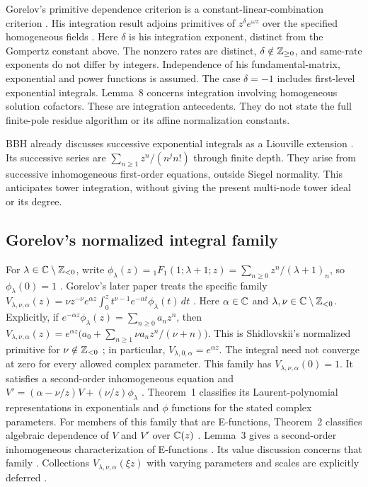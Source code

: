 Gorelov's primitive dependence criterion is a constant-linear-combination criterion
\cite[Lemma~6, p.~670]{Gorelov2016}.
His integration result adjoins primitives of $z^\delta e^{\omega z}$
over the specified homogeneous fields
\cite[Lemma~7, pp.~670--672]{Gorelov2016}.
Here $\delta$ is his integration exponent, distinct from the Gompertz constant above.
The nonzero rates are distinct, $\delta\notin\mathbb{Z}_{\ge0}$,
and same-rate exponents do not differ by integers.
Independence of his fundamental-matrix, exponential and power functions is assumed.
The case $\delta=-1$ includes first-level exponential integrals.
Lemma~8 concerns integration involving homogeneous solution cofactors.
These are integration antecedents.
They do not state the full finite-pole residue algorithm or its affine normalization constants.

BBH already discusses successive exponential integrals as a Liouville extension
\cite[p.~281]{BBH1988}.
Its successive series are $\sum_{n\ge1}z^n/(n^j n!)$ through finite depth.
They arise from successive inhomogeneous first-order equations, outside Siegel normality.
This anticipates tower integration, without giving the present multi-node tower ideal or its degree.

\subsection*{Gorelov's normalized integral family}
For $\lambda\in\mathbb{C}\setminus\mathbb{Z}_{<0}$, write
$\phi_\lambda(z)={}_1F_1(1;\lambda+1;z)=\sum_{n\ge0}z^n/(\lambda+1)_n$,
so $\phi_\lambda(0)=1$ \cite[p.~384]{Gorelov2025}.
Gorelov's later paper treats the specific family
$V_{\lambda,\nu,\alpha}(z)=\allowbreak\nu z^{-\nu}e^{\alpha z}\allowbreak\int_0^z t^{\nu-1}e^{-\alpha t}\phi_\lambda(t)\,dt$
\cite[pp.~383--384]{Gorelov2025}.
Here $\alpha\in\mathbb{C}$ and $\lambda,\nu\in\mathbb{C}\setminus\mathbb{Z}_{<0}$.
Explicitly, if $e^{-\alpha z}\phi_\lambda(z)=\sum_{n\ge0}a_nz^n$, then
$V_{\lambda,\nu,\alpha}(z)=e^{\alpha z}
\bigl(a_0+\sum_{n\ge1}\nu a_nz^n/(\nu+n)\bigr)$.
This is Shidlovskii's normalized primitive for $\nu\notin\mathbb{Z}_{<0}$
\cite[p.~384]{Gorelov2025}; in particular, $V_{\lambda,0,\alpha}=e^{\alpha z}$.
The integral need not converge at zero for every allowed complex parameter.
This family has $V_{\lambda,\nu,\alpha}(0)=1$.
It satisfies a second-order inhomogeneous equation and
$V'=(\alpha-\nu/z)V+(\nu/z)\phi_\lambda$
\cite[p.~384; (17), p.~385]{Gorelov2025}.
Theorem~1 classifies its Laurent-polynomial representations in exponentials and $\phi$ functions
for the stated complex parameters. For members of this family that are E-functions,
Theorem~2 classifies algebraic dependence of $V$ and $V'$ over $\mathbb{C}(z)$
\cite[pp.~384--385]{Gorelov2025}.
Lemma~3 gives a second-order inhomogeneous characterization of E-functions
\cite[p.~386]{Gorelov2025}.
Its value discussion concerns that family
\cite[Conclusion~1, p.~390]{Gorelov2025}.
Collections $V_{\lambda,\nu,\alpha}(\xi z)$ with varying parameters and scales are explicitly deferred
\cite[\S4, item~2 (Conclusion~2), p.~390]{Gorelov2025}.

